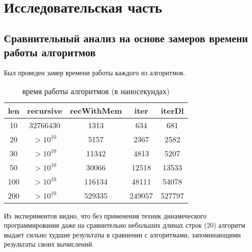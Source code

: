 \chapter{Исследовательская часть}

\section{Сравнительный анализ на основе замеров времени работы алгоритмов}

Был проведен замер времени работы каждого из алгоритмов.


\begin{table} [h!]
\caption{время работы алгоритмов (в наносекундах)}
	\begin{tabular}{|c c c c c|} 
 	\hline
	len & recursive & recWithMem & iter & iterDl \\ [0.8ex] 
 	\hline\hline
 	10 & 32766430 & 1313 & 634 & 681\\
 	\hline
    20 & $> 10^{10}$ & 5157 & 2367 & 2582\\
 	\hline
    30 & $> 10^{10}$ & 11342 & 4813 & 5207\\
	\hline
	50 & $> 10^{10}$ & 30066 & 12518 & 13533\\
	\hline
    100 & $> 10^{10}$ & 116134 & 48111 & 54078\\
	\hline
    200 & $> 10^{10}$ & 529335 & 249057 & 527797\\
	\hline
	\end{tabular}
\end{table}




\par
Из экспериментов видно, что без применения техник динамеческого программирования даже на сравнительно небольших длинах строк (20) алгоритм выдает сильно худшие результаты в сравнении с алгоритмами, запоминающими результаты своих вычислений.


